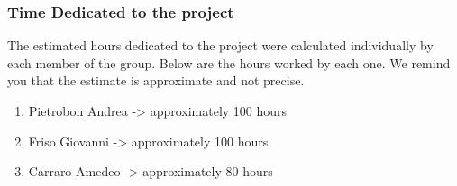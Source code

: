 \documentclass[
	a4paper, %
	10pt, %
	unnumberedsections, %
	twoside, %
]{LTJournalArticle}
\begin{document}
\subsubsection{Time Dedicated to the project}
The estimated hours dedicated to the project were calculated individually by each member of the group. Below are the hours worked by each one. We remind you that the estimate is approximate and not precise.
\begin{enumerate}
	\item Pietrobon Andrea -> approximately 100 hours
	\item Friso Giovanni -> approximately 100 hours
    \item Carraro Amedeo -> approximately 80 hours
\end{enumerate}


\printbibliography %

\end{document}
